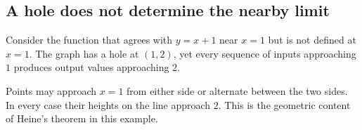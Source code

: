 \subsection{A hole does not determine the nearby limit}

Consider the function that agrees with \(y=x+1\) near \(x=1\) but is not defined at \(x=1\). The graph has a hole at \((1,2)\), yet every sequence of inputs approaching \(1\) produces output values approaching \(2\).

\begin{center}
\end{center}

\begin{interpretationbox}
Points may approach \(x=1\) from either side or alternate between the two sides. In every case their heights on the line approach \(2\). This is the geometric content of Heine's theorem in this example.
\end{interpretationbox}
